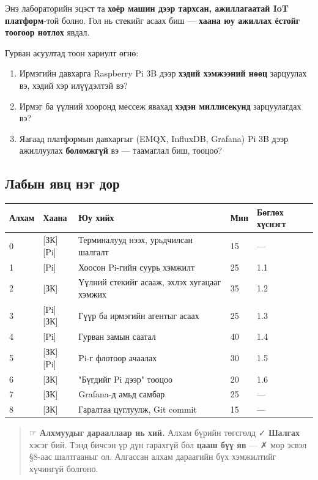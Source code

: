 Энэ лабораторийн эцэст та \textbf{хоёр машин дээр тархсан, ажиллагаатай IoT платформ}-той болно. Гол нь стекийг асаах биш --- \textbf{хаана юу ажиллах ёстойг тоогоор нотлох} явдал.

Гурван асуултад тоон хариулт өгнө:

\begin{enumerate}
\def\labelenumi{\arabic{enumi}.}
\tightlist
\item
  Ирмэгийн давхарга Raspberry Pi 3B дээр \textbf{хэдий хэмжээний нөөц} зарцуулах вэ, хэдий хэр илүүдэлтэй вэ?
\item
  Ирмэг ба үүлний хооронд мессеж явахад \textbf{хэдэн миллисекунд} зарцуулагдах вэ?
\item
  Яагаад платформын давхаргыг (EMQX, InfluxDB, Grafana) Pi 3B дээр ажиллуулах \textbf{боломжгүй} вэ --- таамаглал биш, тооцоо?
\end{enumerate}

\hypertarget{ux43bux430ux431ux44bux43d-ux44fux432ux446-ux43dux44dux433-ux434ux43eux440}{%
\subsection{Лабын явц нэг дор}\label{ux43bux430ux431ux44bux43d-ux44fux432ux446-ux43dux44dux433-ux434ux43eux440}}

\begingroup\scriptsize\begin{longtable}[]{@{}lllll@{}}
\toprule
Алхам & Хаана & Юу хийх & Мин & Бөглөх хүснэгт\tabularnewline
\midrule
\endhead
0 & {[}ЗК{]}{[}Pi{]} & Терминалууд нээх, урьдчилсан шалгалт & 15 & ---\tabularnewline
1 & {[}Pi{]} & Хоосон Pi-гийн суурь хэмжилт & 25 & 1.1\tabularnewline
2 & {[}ЗК{]} & Үүлний стекийг асааж, эхлэх хугацааг хэмжих & 35 & 1.2\tabularnewline
3 & {[}Pi{]}{[}ЗК{]} & Гүүр ба ирмэгийн агентыг асаах & 25 & 1.3\tabularnewline
4 & {[}Pi{]} & Гурван замын саатал & 40 & 1.4\tabularnewline
5 & {[}ЗК{]}{[}Pi{]} & Pi-г флотоор ачаалах & 30 & 1.5\tabularnewline
6 & {[}ЗК{]} & "Бүгдийг Pi дээр" тооцоо & 20 & 1.6\tabularnewline
7 & {[}ЗК{]} & Grafana-д амьд самбар & 25 & ---\tabularnewline
8 & {[}ЗК{]} & Гаралтаа цуглуулж, Git commit & 15 & ---\tabularnewline
\bottomrule
\end{longtable}\endgroup

\begin{quote}
☞ \textbf{Алхмуудыг дарааллаар нь хий.} Алхам бүрийн төгсгөлд ✓ \textbf{Шалгах} хэсэг бий. Тэнд бичсэн үр дүн гарахгүй бол \textbf{цааш бүү яв} --- ✗ мөр эсвэл §8-аас шалтгааныг ол. Алгассан алхам дараагийн бүх хэмжилтийг хүчингүй болгоно.
\end{quote}

